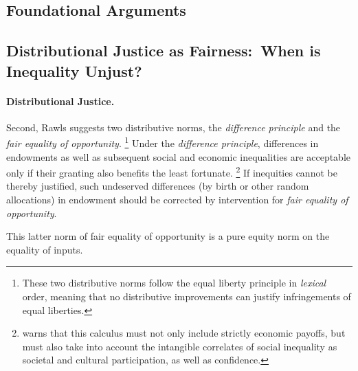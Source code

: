 


\subsection[Foundational Arguments]{Foundational Arguments}

\subsection[Distributional Justice (as Fairness)]{Distributional Justice as Fairness:~When is Inequality Unjust?}
\paragraph{Distributional Justice.}
Second, Rawls suggests two distributive norms, the \emph{difference principle} and the \emph{fair equality of opportunity}.
\footnote{
	These two distributive norms follow the equal liberty principle in \emph{lexical} order, meaning that no distributive improvements can justify infringements of equal liberties.
}
Under the \emph{difference principle}, differences in endowments as well as subsequent social and economic inequalities are acceptable only if their granting also benefits the least fortunate.
\footnote{
	\cite[122]{Rawls-1971} warns that this calculus must not only include strictly economic payoffs, but must also take into account the intangible correlates of social inequality as societal and cultural participation, as well as confidence.
}
If inequities cannot be thereby justified, such undeserved differences (by birth or other random allocations) in endowment should be corrected by intervention for \emph{fair equality of opportunity}.

This latter norm of fair equality of opportunity is a pure equity norm on the equality of inputs.

